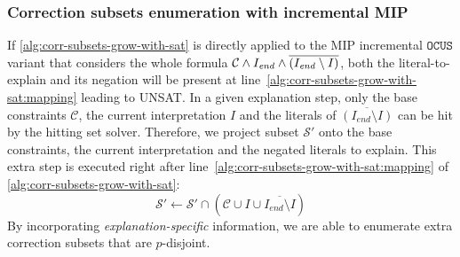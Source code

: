 \documentclass[twoside,11pt]{article}
\newcommand\m[1]{\mathcal{#1}}
\newcommand\comment[1]{\marginpar{\tiny #1}}
\renewcommand\comment[1]{#1}
\newcommand{\tias}[1]{{\comment{\color{blue}Tias:#1}}}
\newcommand\subsetT{\ensuremath{\m{S} }\xspace}
\newcommand\Iend{\ensuremath{I_\mathit{end} }\xspace}
\newcommand\formula{\ensuremath{\m{F} }\xspace}
\newcommand\formulac{\ensuremath{\m{C} }\xspace}
\newcommand\mm[1]{\ensuremath{#1}\xspace}
\newcommand\call[1]{\mm{\texttt{#1}}}
\newcommand\sat{\texttt{{SAT}}\xspace}
\newcommand\grow{\mm{\call{Grow}}}
\newcommand\comus{\mm{\call{OCUS}}}
\newcommand\corrsubsets{\mm{\call{CorrSubsets}}}
\begin{document}
\subsubsection{Correction subsets enumeration with incremental MIP} If \cref{alg:corr-subsets-grow-with-sat} is directly applied to the MIP incremental \comus variant that considers the whole formula $\formulac\land \textbf{\Iend} \land \overline{(\Iend\setminus I)}$, both the literal-to-explain and its negation will be present at line~\ref{alg:corr-subsets-grow-with-sat:mapping} leading to UNSAT. In  a given explanation step, only the base constraints $\formulac$, the current interpretation $I$ and the literals of $\overline{(\Iend\setminus I)}$ can be hit by the hitting set solver.  
Therefore, we project subset $\m{S'}$ onto the base constraints, the current interpretation and the negated literals to explain. This extra step is executed right after line~\ref{alg:corr-subsets-grow-with-sat:mapping} of \cref{alg:corr-subsets-grow-with-sat}:
\[ \m{S}' \gets \m{S}'  \cap (\formulac \cup I \cup \overline{\Iend \setminus I}) \]
By incorporating \emph{explanation-specific} information, we are able to enumerate extra correction subsets that are $p$-disjoint.





\end{document}
